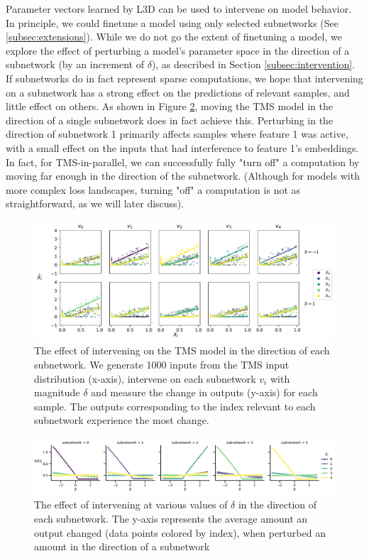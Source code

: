 \documentclass{article}
\theoremstyle{plain}
\theoremstyle{definition}
\theoremstyle{remark}
\begin{document}
Parameter vectors learned by L3D can be used to intervene on model behavior. In principle, we could finetune a model using only selected subnetworks (See \ref{subsec:extensions}). While we do not go the extent of finetuning a model, we explore the effect of perturbing a model's parameter space in the direction of a subnetwork (by an increment of $\delta$), as described in Section \ref{subsec:intervention}. If subnetworks do in fact represent sparse computations, we hope that intervening on a subnetwork has a strong effect on the predictions of relevant samples, and little effect on others. As shown in Figure \ref{fig:4_tms_intervention}, moving the TMS model in the direction of a single subnetwork does in fact achieve this. Perturbing in the direction of subnetwork 1 primarily affects samples where feature 1 was active, with a small effect on the inputs that had interference to feature 1's embeddings. In fact, for TMS-in-parallel, we can successfully fully "turn off" a computation by moving far enough in the direction of the subnetwork. (Although for models with more complex loss landscapes, turning "off" a computation is not as straightforward, as we will later discuss).

\begin{figure}
    \centerline{\includegraphics[width=\columnwidth]{../figures/4_tms_intervention.pdf}}
    \centering
    \caption{The effect of intervening on the TMS model in the direction of each subnetwork. We generate 1000 inputs from the TMS input distribution (x-axis), intervene on each subnetwork $v_i$ with magnitude $\delta$ and measure the change in outputs (y-axis) for each sample. The outputs corresponding to the index relevant to each subnetwork experience the most change.}\label{fig:4_tms_intervention}
\end{figure}

\begin{figure}
    \centerline{\includegraphics[width=\columnwidth]{../figures/4_tms_intervention_mean.pdf}}
    \centering
    \caption{The effect of intervening at various values of $\delta$ in the direction of each subnetwork. The y-axis represents the average amount an output changed (data points colored by index), when perturbed an amount \delta in the direction of a subnetwork }\label{fig:4_tms_intervention}
\end{figure}
\end{document}
